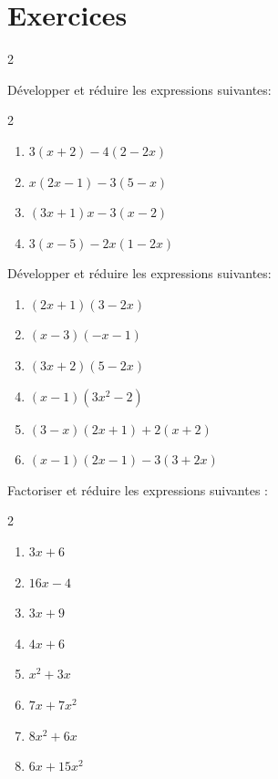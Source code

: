 \newpage
\section{Exercices}
 {
  \small
  \setlength{\columnseprule}{0.6pt}
  \begin{multicols}{2}
	  \begin{exo}[Développement]
		  Développer et réduire les expressions suivantes:
		  \vspace*{-2mm}
		  \begin{multicols}{2}
			  \begin{enumerate}[label=\alph*)]
				  \item $3(x + 2) - 4(2 - 2x)$
				  \item $x(2x - 1) - 3(5 - x)$
				  \item $(3x + 1)x - 3(x - 2)$
				  \item $3(x - 5) - 2x(1 - 2x)$
			  \end{enumerate}
		  \end{multicols}
	  \end{exo}

	  \begin{exo}[Développement]
		  Développer et réduire les expressions suivantes:
		  \begin{enumerate}[label=\alph*)]
			  \item $(2x + 1)(3 - 2x)$
			  \item $(x - 3)(-x - 1)$
			  \item $(3x + 2)(5 - 2x)$
			  \item $(x - 1)(3x^{2} - 2)$
			  \item $(3 - x)(2x + 1) + 2(x + 2)$
			  \item $(x - 1)(2x - 1) - 3(3 + 2x)$
		  \end{enumerate}
	  \end{exo}

	  \begin{exo}[Factorisation]
		  Factoriser et réduire les expressions suivantes :
		  \vspace*{-2mm}
		  \begin{multicols}{2}
			  \begin{enumerate}[label=\alph*)]
				  \item $3x + 6$
				  \item $16x - 4$
				  \item $3x + 9$
				  \item $4x + 6$
				  \item $x^{2} + 3x$
				  \item $7x + 7x^{2}$
				  \item $8x^{2} + 6x$
				  \item $6x + 15x^{2}$
			  \end{enumerate}
		  \end{multicols}
	  \end{exo}


\end{multicols}}
